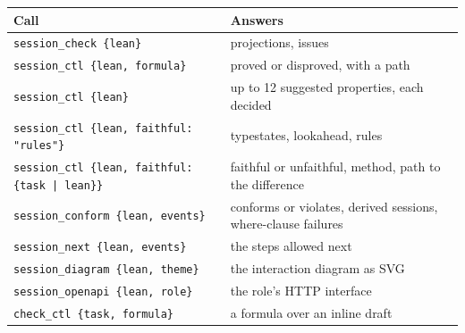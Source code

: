 \begin{center}
\begin{tabular}{@{}p{}p{}@{}}
\toprule
Call & Answers \\
\midrule
\texttt{session\_check \{lean\}} & projections, issues \\
\texttt{session\_ctl \{lean, formula\}} & proved or disproved, with a path \\
\texttt{session\_ctl \{lean\}} & up to 12 suggested properties, each decided \\
\texttt{session\_ctl \{lean, faithful: "rules"\}} & typestates, lookahead, rules \\
\texttt{session\_ctl \{lean, faithful: \{task | lean\}\}} & faithful or unfaithful, method, path to the difference \\
\texttt{session\_conform \{lean, events\}} & conforms or violates, derived sessions, where-clause failures \\
\texttt{session\_next \{lean, events\}} & the steps allowed next \\
\texttt{session\_diagram \{lean, theme\}} & the interaction diagram as SVG \\
\texttt{session\_openapi \{lean, role\}} & the role's HTTP interface \\
\texttt{check\_ctl \{task, formula\}} & a formula over an inline draft \\
\bottomrule
\end{tabular}
\end{center}
